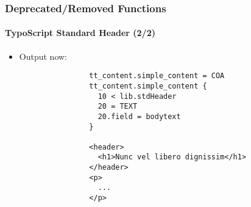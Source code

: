 
\begin{frame}[fragile]
	\frametitle{Deprecated/Removed Functions}
	\framesubtitle{TypoScript Standard Header (2/2)}

	\lstset{basicstyle=\tiny\ttfamily}

	\begin{itemize}

		\item Output now:

			\begin{lstlisting}
				tt_content.simple_content = COA
				tt_content.simple_content {
				  10 < lib.stdHeader
				  20 = TEXT
				  20.field = bodytext
				}

				<header>
				  <h1>Nunc vel libero dignissim</h1>
				</header>
				<p>
				  ...
				</p>
			\end{lstlisting}

	\end{itemize}

\end{frame}


